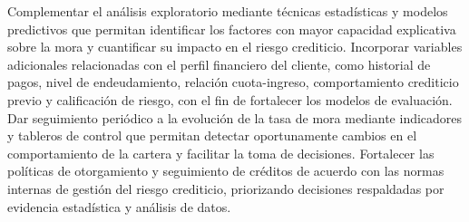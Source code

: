 Complementar el análisis exploratorio mediante técnicas estadísticas y modelos predictivos que permitan identificar los factores con mayor capacidad explicativa sobre la mora y cuantificar su impacto en el riesgo crediticio.
Incorporar variables adicionales relacionadas con el perfil financiero del cliente, como historial de pagos, nivel de endeudamiento, relación cuota-ingreso, comportamiento crediticio previo y calificación de riesgo, con el fin de fortalecer los modelos de evaluación.
Dar seguimiento periódico a la evolución de la tasa de mora mediante indicadores y tableros de control que permitan detectar oportunamente cambios en el comportamiento de la cartera y facilitar la toma de decisiones.
Fortalecer las políticas de otorgamiento y seguimiento de créditos de acuerdo con las normas internas de gestión del riesgo crediticio, priorizando decisiones respaldadas por evidencia estadística y análisis de datos.